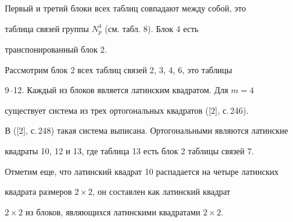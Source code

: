 Первый и третий блоки всех таблиц совпадают между собой, это 


таблица связей группы $N^4_p$ (см. табл. 8). Блок 4 есть 


транспонированный блок 2.





Рассмотрим блок 2 всех таблиц связей 2, 3, 4, 6, это таблицы


9--12. Каждый из блоков является латинским квадратом. Для $m=4$


существует система из трех ортогональных квадратов ([2], с.\,246).


В ([2], с.\,248) такая система выписана. Ортогональными являются латинские


квадраты 10, 12 и 13, где таблица 13 есть блок 2 таблицы связей 7.


Отметим еще, что латинский квадрат 10 распадается на четыре латинских 


квадрата размеров $2\times 2$, он составлен как латинский квадрат


$2\times 2$ из блоков, являющихся латинскими квадратами $2\times 2$.


\smallskip





